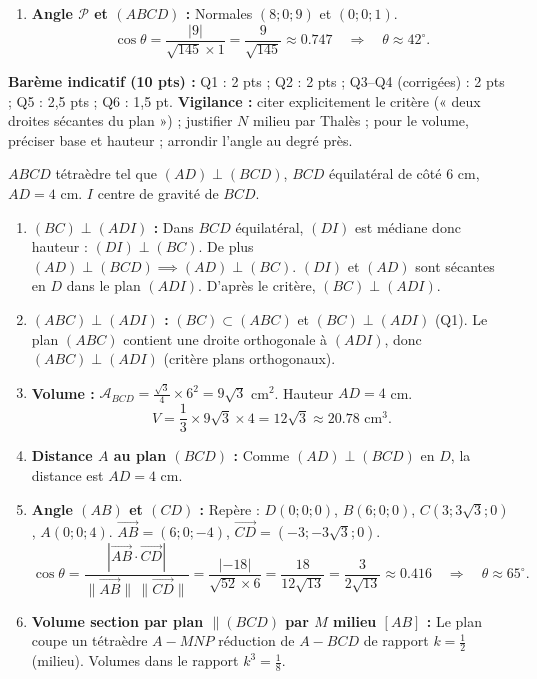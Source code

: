\documentclass[11pt]{article}
\newcommand{\cle}[1]{{\popxbold\color{popdark}#1}}
\begin{document}
\begin{corrige}
\begin{enumerate}
\[ V = \frac{1}{3}\times\frac{9\sqrt{145}}{4}\times\frac{48}{\sqrt{145}} = 36 \text{ cm}^3. \]
\item \textbf{Angle $\mathcal{P}$ et $(ABCD)$ :} Normales $(8;0;9)$ et $(0;0;1)$.
\[ \cos\theta = \frac{|9|}{\sqrt{145}\times 1} = \frac{9}{\sqrt{145}} \approx \num{0,747} \quad\Rightarrow\quad \theta \approx 42^\circ.
\]
\end{enumerate}
\textbf{Barème indicatif (10 pts) :} Q1 : 2 pts ; Q2 : 2 pts ; Q3–Q4 (corrigées) : 2 pts ; Q5 : 2,5 pts ; Q6 : 1,5 pt.
\textbf{Vigilance :} citer explicitement le critère (« deux droites sécantes du plan ») ; justifier $N$ milieu par Thalès ; pour le volume, préciser base et hauteur ; arrondir l'angle au degré près.
\end{corrige}

\begin{corrige}
$ABCD$ tétraèdre tel que $(AD)\perp(BCD)$, $BCD$ équilatéral de côté $6$ cm, $AD=4$ cm. $I$ centre de gravité de $BCD$.
\begin{enumerate}
\item \textbf{$(BC)\perp(ADI)$ :} Dans $BCD$ équilatéral, $(DI)$ est médiane donc hauteur : $(DI)\perp(BC)$. De plus $(AD)\perp(BCD) \implies (AD)\perp(BC)$. $(DI)$ et $(AD)$ sont sécantes en $D$ dans le plan $(ADI)$. D'après le critère, $(BC)\perp(ADI)$.
\item \textbf{$(ABC)\perp(ADI)$ :} $(BC)\subset(ABC)$ et $(BC)\perp(ADI)$ (Q1). Le plan $(ABC)$ contient une droite orthogonale à $(ADI)$, donc $(ABC)\perp(ADI)$ (critère plans orthogonaux).
\item \textbf{Volume :} $\mathcal{A}_{BCD} = \frac{\sqrt{3}}{4}\times 6^2 = 9\sqrt{3}$ cm$^2$. Hauteur $AD=4$ cm.
\[ V = \frac{1}{3}\times 9\sqrt{3}\times 4 = 12\sqrt{3} \approx \num{20,78} \text{ cm}^3. \]
\item \textbf{Distance $A$ au plan $(BCD)$ :} Comme $(AD)\perp(BCD)$ en $D$, la distance est $AD = 4$ cm.
\item \textbf{Angle $(AB)$ et $(CD)$ :} Repère : $D(0;0;0)$, $B(6;0;0)$, $C(3;3\sqrt{3};0)$, $A(0;0;4)$.
$\overrightarrow{AB}=(6;0;-4)$, $\overrightarrow{CD}=(-3;-3\sqrt{3};0)$.
\[ \cos\theta = \frac{|\overrightarrow{AB}\cdot\overrightarrow{CD}|}{\|\overrightarrow{AB}\|\,\|\overrightarrow{CD}\|} = \frac{|-18|}{\sqrt{52}\times 6} = \frac{18}{12\sqrt{13}} = \frac{3}{2\sqrt{13}} \approx \num{0,416} \quad\Rightarrow\quad \theta \approx 65^\circ. \]
\item \textbf{Volume section par plan $\parallel(BCD)$ par $M$ milieu $[AB]$ :} Le plan coupe un tétraèdre $A-MNP$ \cle{réduction} de $A-BCD$ de rapport $k=\frac{1}{2}$ (milieu). Volumes dans le rapport $k^3 = \frac{1}{8}$.

\end{enumerate}
\end{corrige}
\end{document}
